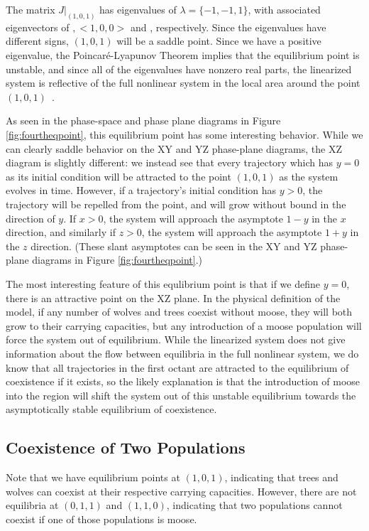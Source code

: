 \documentclass[10pt]{article}
\begin{document}
The matrix \(J|_{(1,0,1)}\) has eigenvalues of \(\lambda = \{-1,-1,1\}\), with associated eigenvectors of \(<0,0,1>,<1,0,0>\) and \(<-1,2,1>\), respectively. Since the eigenvalues have different signs, \( (1,0,1) \) will be a saddle point. Since we have a positive eigenvalue, the Poincar\'{e}-Lyapunov Theorem implies that the equilibrium point is unstable, and since all of the eigenvalues have nonzero real parts, the linearized system is reflective of the full nonlinear system in the local area around the point \((1,0,1)\)~\cite{PLT}.

As seen in the phase-space and phase plane diagrams in Figure \ref{fig:fourtheqpoint}, this equilibrium point has some interesting behavior. While we can clearly saddle behavior on the XY and YZ phase-plane diagrams, the XZ diagram is slightly different: we instead see that every trajectory which has \(y=0\) as its initial condition will be attracted to the point \((1,0,1)\) as the system evolves in time. However, if a trajectory's initial condition has \(y>0\), the trajectory will be repelled from the point, and will grow without bound in the direction of \(y\). If \(x>0\), the system will approach the asymptote \(1-y\) in the \(x\) direction, and similarly if \(z>0\), the system will approach the asymptote \(1+y\) in the \(z\) direction. (These slant asymptotes can be seen in the XY and YZ phase-plane diagrams in Figure \ref{fig:fourtheqpoint}.)

The most interesting feature of this equlibrium point is that if we define \(y=0\), there is an attractive point on the XZ plane. In the physical definition of the model, if any number of wolves and trees coexist without moose, they will both grow to their carrying capacities, but any introduction of a moose population will force the system out of equilibrium. While the linearized system does not give information about the flow between equilibria in the full nonlinear system, we do know that all trajectories in the first octant are attracted to the equilibrium of coexistence if it exists, so the likely explanation is that the introduction of moose into the region will shift the system out of this unstable equilibrium towards the asymptotically stable equilibrium of coexistence.

\subsection{Coexistence of Two Populations}

Note that we have equilibrium points at \((1,0,1)\), indicating that trees and wolves can coexist at their respective carrying capacities. However, there are not equilibria at \((0,1,1)\) and \((1,1,0)\), indicating that two populations cannot coexist if one of those populations is moose.
\end{document}
